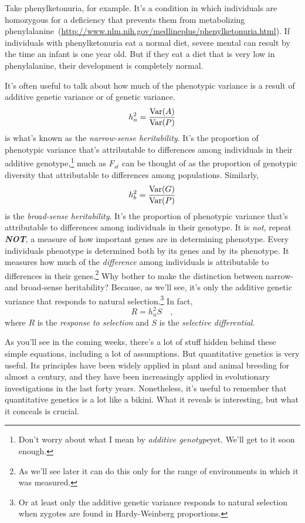 \documentclass[12pt]{article}
\begin{document}
Take phenylketonuria, for example. It's a condition in which
individuals are homozygous for a deficiency that prevents them from
metabolizing
phenylalanine~(\url{http://www.nlm.nih.gov/medlineplus/phenylketonuria.html}). If
individuals with phenylketonuria eat a normal diet, severe mental can
result by the time an infant is one year old. But if they eat a diet
that is very low in phenylalanine, their development is completely
normal.

It's often useful to talk about how much of the phenotypic variance is
a result of additive genetic variance or of genetic variance.
\[
h^2_n = \frac{\mbox{Var}(A)}{\mbox{Var}(P)}
\]
is what's known as the {\it narrow-sense heritability}. It's the
proportion of phenotypic variance that's attributable to differences
among individuals in their additive genotype,\footnote{Don't worry
  about what I mean by {\it additive genotype}{\dash}yet. We'll get to
  it soon enough.} much as $F_{st}$ can be thought of as the
proportion of genotypic diversity that attributable to differences
among populations. Similarly,
\[
h^2_b = \frac{\mbox{Var}(G)}{\mbox{Var}(P)}
\]
is the {\it broad-sense heritability}. It's the proportion of
phenotypic variance that's attributable to differences among
individuals in their genotype. It is {\it not}, repeat {\bf\it NOT}, a
measure of how important genes are in determining phenotype. Every
individuals phenotype is determined both by its genes and by its
phenotype. It measures how much of the {\it difference\/} among
individuals is attributable to differences in their genes.\footnote{As
  we'll see later it can do this only for the range of environments in
  which it was measured.} Why bother
to make the distinction between narrow- and broad-sense heritability?
Because, as we'll see, it's only the additive genetic variance that
responds to natural selection.\footnote{Or at least only the additive
  genetic variance responds to natural selection when zygotes are
  found in Hardy-Weinberg proportions.} In fact,
\[
R = h^2_nS \quad ,
\]
where $R$ is the {\it response to selection\/} and $S$ is the
{\it selective differential}.

As you'll see in the coming weeks, there's a lot of stuff hidden
behind these simple equations, including a lot of assumptions. But
quantitative genetics is very useful. Its principles have been widely
applied in plant and animal breeding for almost a century, and they
have been increasingly applied in evolutionary investigations in the
last forty years. Nonetheless, it's useful to remember that
quantitative genetics is a lot like a bikini. What it reveals is
interesting, but what it conceals is crucial.
\end{document}
